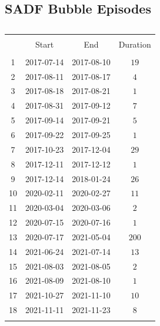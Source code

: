 \documentclass[11pt]{article}
\begin{document}
\begin{appendices}
\section{SADF Bubble Episodes}
\begin{table}[!htbp] \centering 
  \caption{} 
  \label{} 
\begin{tabular}{@{\extracolsep{5pt}} cccc} 
\\[-1.8ex]\hline 
\hline \\[-1.8ex] 
 & Start & End & Duration \\ 
\hline \\[-1.8ex] 
1 & 2017-07-14 & 2017-08-10 & $19$ \\ 
2 & 2017-08-11 & 2017-08-17 & $4$ \\ 
3 & 2017-08-18 & 2017-08-21 & $1$ \\ 
4 & 2017-08-31 & 2017-09-12 & $7$ \\ 
5 & 2017-09-14 & 2017-09-21 & $5$ \\ 
6 & 2017-09-22 & 2017-09-25 & $1$ \\ 
7 & 2017-10-23 & 2017-12-04 & $29$ \\ 
8 & 2017-12-11 & 2017-12-12 & $1$ \\ 
9 & 2017-12-14 & 2018-01-24 & $26$ \\ 
10 & 2020-02-11 & 2020-02-27 & $11$ \\ 
11 & 2020-03-04 & 2020-03-06 & $2$ \\ 
12 & 2020-07-15 & 2020-07-16 & $1$ \\ 
13 & 2020-07-17 & 2021-05-04 & $200$ \\ 
14 & 2021-06-24 & 2021-07-14 & $13$ \\ 
15 & 2021-08-03 & 2021-08-05 & $2$ \\ 
16 & 2021-08-09 & 2021-08-10 & $1$ \\ 
17 & 2021-10-27 & 2021-11-10 & $10$ \\ 
18 & 2021-11-11 & 2021-11-23 & $8$ \\ 
\hline \\[-1.8ex] 
\end{tabular} 
\end{table}  
\newpage


\end{appendices}
\end{document}
